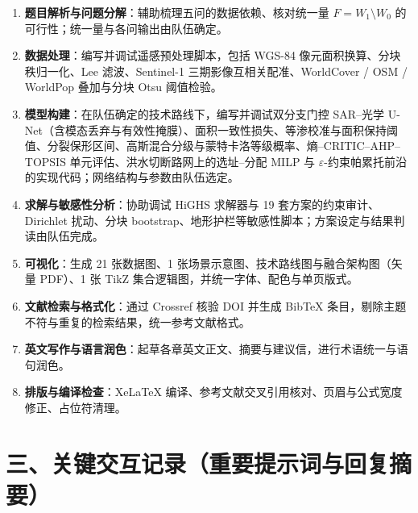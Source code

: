 \documentclass[11pt,a4paper]{ctexart}
\begin{document}
\begin{enumerate}[label=\arabic*.]
\item \textbf{题目解析与问题分解}：辅助梳理五问的数据依赖、核对统一量 $F=W_1\setminus W_0$ 的可行性；统一量与各问输出由队伍确定。
\item \textbf{数据处理}：编写并调试遥感预处理脚本，包括 WGS-84 像元面积换算、分块秩归一化、Lee 滤波、Sentinel-1 三期影像互相关配准、WorldCover / OSM / WorldPop 叠加与分块 Otsu 阈值检验。
\item \textbf{模型构建}：在队伍确定的技术路线下，编写并调试双分支门控 SAR--光学 U-Net（含模态丢弃与有效性掩膜）、面积一致性损失、等渗校准与面积保持阈值、分裂保形区间、高斯混合分级与蒙特卡洛等级概率、熵--CRITIC--AHP--TOPSIS 单元评估、洪水切断路网上的选址--分配 MILP 与 $\varepsilon$-约束帕累托前沿的实现代码；网络结构与参数由队伍选定。
\item \textbf{求解与敏感性分析}：协助调试 HiGHS 求解器与 19 套方案的约束审计、Dirichlet 扰动、分块 bootstrap、地形护栏等敏感性脚本；方案设定与结果判读由队伍完成。
\item \textbf{可视化}：生成 21 张数据图、1 张场景示意图、技术路线图与融合架构图（矢量 PDF）、1 张 TikZ 集合逻辑图，并统一字体、配色与单页版式。
\item \textbf{文献检索与格式化}：通过 Crossref 核验 DOI 并生成 BibTeX 条目，剔除主题不符与重复的检索结果，统一参考文献格式。
\item \textbf{英文写作与语言润色}：起草各章英文正文、摘要与建议信，进行术语统一与语句润色。
\item \textbf{排版与编译检查}：XeLaTeX 编译、参考文献交叉引用核对、页眉与公式宽度修正、占位符清理。
\end{enumerate}

\section*{三、关键交互记录（重要提示词与回复摘要）}
\end{document}
